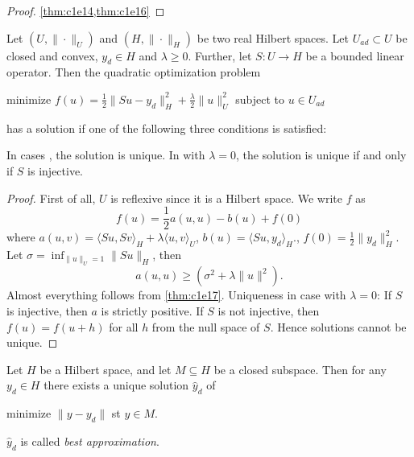 \documentclass[../skript.tex]{subfiles}
\begin{document}
\begin{proof}
\cref{thm:c1e14,thm:c1e16}
\end{proof}
\begin{theorem} %
\label{thm:c1e18}
Let $(U, \| \cdot \|_U)$ and $(H, \| \cdot \|_H)$ be two real Hilbert spaces. Let $U_{ad} \subset U$ be closed and convex, $y_d \in H$ and $\lambda \geq 0$.
Further, let $S : U \to H$ be a bounded linear operator. Then the quadratic optimization problem\par
\begin{mdframed}[style=theoremframing]
minimize $f(u) = \frac{1}{2} \| Su - y_d \|_H^2 + \frac{\lambda}{2} \| u \|_U^2$ subject to $u \in U_{ad}$
\end{mdframed}
has a solution if one of the following three conditions is satisfied:
In cases ,  the solution is unique. In  with $\lambda = 0$, the solution is unique if and only if $S$ is injective.
\end{theorem}
\begin{proof}
First of all, $U$ is reflexive since it is a Hilbert space. We write $f$ as
\[
	f(u) = \frac{1}{2} a(u, u) - b(u) + f(0)
\]
where $a(u, v) = \langle Su, Sv \rangle_H + \lambda \langle u, v \rangle_U$, $b(u) = \langle Su, y_d \rangle_H$., $f(0) = \frac{1}{2} \| y_d \|_H^2$.
Let $\sigma = \inf_{\| u \|_U = 1} \| S u \|_H$, then
\[
	a(u, u) \geq (\sigma^2 + \lambda \| u \|^2).
\]
Almost everything follows from \cref{thm:c1e17}. Uniqueness in case  with $\lambda = 0$: If $S$ is injective, then $a$ is strictly positive. If $S$ is not injective, then $f(u) = f(u + h)$ for all $h$ from the null space of $S$.
Hence solutions cannot be unique.
\end{proof}
\begin{examplenumb} %
\label{ex:c1e19}
Let $H$ be a Hilbert space, and let $M \subseteq H$ be a closed subspace. Then for any $y_d \in H$ there exists a unique solution $\hat{y}_d$ of
\begin{mdframed}[style=theoremframing]
minimize $\| y - y_d \|$ \ac{st} $y \in M$.
\end{mdframed}
$\hat{y}_d$ is called \emph{best approximation}.
\end{examplenumb}
\pagebreak
\end{document}
